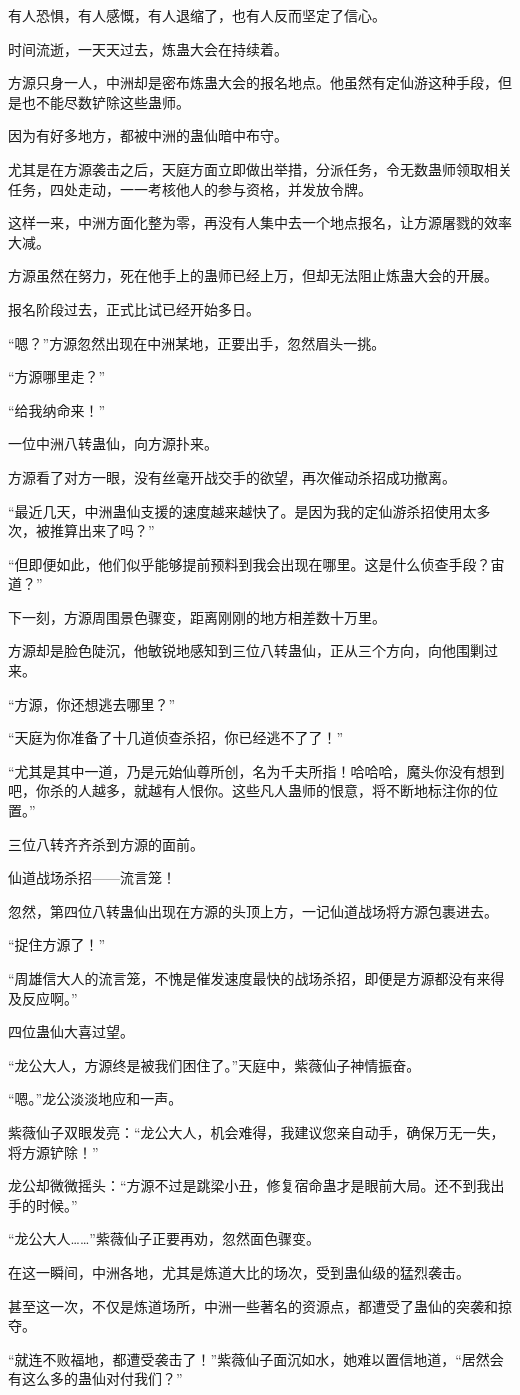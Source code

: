 \begin{this_body}
有人恐惧，有人感慨，有人退缩了，也有人反而坚定了信心。

时间流逝，一天天过去，炼蛊大会在持续着。

方源只身一人，中洲却是密布炼蛊大会的报名地点。他虽然有定仙游这种手段，但是也不能尽数铲除这些蛊师。

因为有好多地方，都被中洲的蛊仙暗中布守。

尤其是在方源袭击之后，天庭方面立即做出举措，分派任务，令无数蛊师领取相关任务，四处走动，一一考核他人的参与资格，并发放令牌。

这样一来，中洲方面化整为零，再没有人集中去一个地点报名，让方源屠戮的效率大减。

方源虽然在努力，死在他手上的蛊师已经上万，但却无法阻止炼蛊大会的开展。

报名阶段过去，正式比试已经开始多日。

“嗯？”方源忽然出现在中洲某地，正要出手，忽然眉头一挑。

“方源哪里走？”

“给我纳命来！”

一位中洲八转蛊仙，向方源扑来。

方源看了对方一眼，没有丝毫开战交手的欲望，再次催动杀招成功撤离。

“最近几天，中洲蛊仙支援的速度越来越快了。是因为我的定仙游杀招使用太多次，被推算出来了吗？”

“但即便如此，他们似乎能够提前预料到我会出现在哪里。这是什么侦查手段？宙道？”

下一刻，方源周围景色骤变，距离刚刚的地方相差数十万里。

方源却是脸色陡沉，他敏锐地感知到三位八转蛊仙，正从三个方向，向他围剿过来。

“方源，你还想逃去哪里？”

“天庭为你准备了十几道侦查杀招，你已经逃不了了！”

“尤其是其中一道，乃是元始仙尊所创，名为千夫所指！哈哈哈，魔头你没有想到吧，你杀的人越多，就越有人恨你。这些凡人蛊师的恨意，将不断地标注你的位置。”

三位八转齐齐杀到方源的面前。

仙道战场杀招——流言笼！

忽然，第四位八转蛊仙出现在方源的头顶上方，一记仙道战场将方源包裹进去。

“捉住方源了！”

“周雄信大人的流言笼，不愧是催发速度最快的战场杀招，即便是方源都没有来得及反应啊。”

四位蛊仙大喜过望。

“龙公大人，方源终是被我们困住了。”天庭中，紫薇仙子神情振奋。

“嗯。”龙公淡淡地应和一声。

紫薇仙子双眼发亮：“龙公大人，机会难得，我建议您亲自动手，确保万无一失，将方源铲除！”

龙公却微微摇头：“方源不过是跳梁小丑，修复宿命蛊才是眼前大局。还不到我出手的时候。”

“龙公大人……”紫薇仙子正要再劝，忽然面色骤变。

在这一瞬间，中洲各地，尤其是炼道大比的场次，受到蛊仙级的猛烈袭击。

甚至这一次，不仅是炼道场所，中洲一些著名的资源点，都遭受了蛊仙的突袭和掠夺。

“就连不败福地，都遭受袭击了！”紫薇仙子面沉如水，她难以置信地道，“居然会有这么多的蛊仙对付我们？”

\end{this_body}

